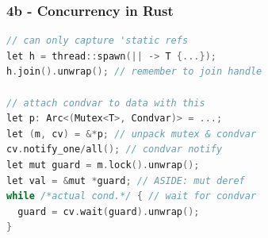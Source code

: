\subsubsection*{4b - Concurrency in Rust}

\begin{lstlisting}[language=C++]
// can only capture 'static refs
let h = thread::spawn(|| -> T {...});
h.join().unwrap(); // remember to join handle

// attach condvar to data with this
let p: Arc<(Mutex<T>, Condvar)> = ...;
let (m, cv) = &*p; // unpack mutex & condvar
cv.notify_one/all(); // condvar notify
let mut guard = m.lock().unwrap();
let val = &mut *guard; // ASIDE: mut deref
while /*actual cond.*/ { // wait for condvar
  guard = cv.wait(guard).unwrap();
}

\end{lstlisting}

\hSep

